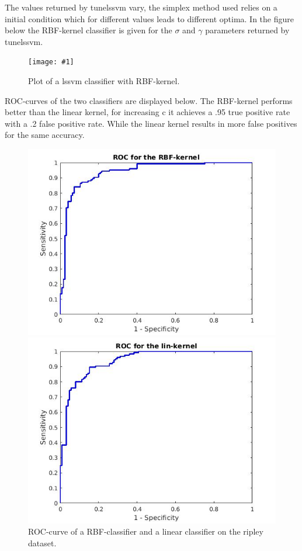 \documentclass[•]{article}
\newcommand{\apicture}[2] {
  \begin{figure}[H]
  \centering
  \texttt{[image: \#1]}
  \caption{#2}
  \end{figure}
  }
\begin{document}
The values returned by tunelssvm vary, the simplex method used relies on a initial condition which for different values leads to different optima. In the figure below the RBF-kernel classifier is given for the $\sigma$ and $\gamma$ parameters returned by tunelssvm.

\apicture{rbfplotripley.jpg}{Plot of a lssvm classifier with RBF-kernel.}

 ROC-curves of the two classifiers are displayed below. The RBF-kernel performs better than the linear kernel, for increasing c it achieves a .95 true positive rate with a .2 false positive rate. While the linear kernel results in more false positives for the same accuracy.

\begin{figure}[h!]
\centering
\begin{minipage}{.45\textwidth}
\includegraphics[width=.8\textwidth]{rocrbf.jpg}
\end{minipage}
\begin{minipage}{.45\textwidth}
\includegraphics[width=.8\textwidth]{roclin.jpg}
\end{minipage}
\caption{ROC-curve of a RBF-classifier and a linear classifier on the ripley dataset.}
\end{figure}
\end{document}
